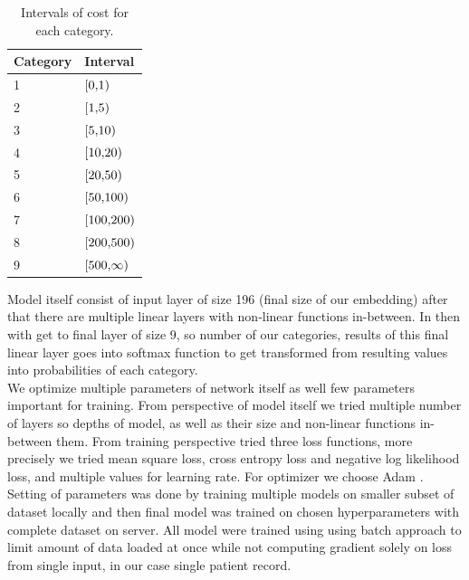 \begin{table}[!h]
	\centering
	\begin{tabular}{|l|l|}
		\hline
		Category  & Interval \\ \hline
		1 & $\interval[{0,1})$ \\ \hline
		2 & $\interval[{1,5})$ \\ \hline
		3 & $\interval[{5,10})$ \\ \hline
		4 & $\interval[{10,20})$ \\ \hline
		5 & $\interval[{20,50})$ \\ \hline
		6 & $\interval[{50,100})$ \\ \hline
		7 & $\interval[{100,200})$ \\ \hline
		8 & $\interval[{200,500})$ \\ \hline
		9 & $\interval[{500,\infty})$ \\ \hline
	\end{tabular}
	\caption{Intervals of cost for each category.}
	\label{tab:cat_interval_record}
\end{table}  

Model itself consist of input layer of size 196 (final size of our embedding) after that there are multiple linear layers with non-linear functions in-between. In then with get to final layer of size 9, so number of our categories, results of this final linear layer goes into softmax function to get transformed from resulting values into probabilities of each category. 
\\

We optimize multiple parameters of network itself as well few parameters important for training. From perspective of model itself we tried multiple number of layers so depths of model, as well as their size and non-linear functions in-between them. From training perspective tried three loss functions, more precisely we tried mean square loss, cross entropy loss and negative log likelihood loss, and multiple values for learning rate. For optimizer we choose Adam \cite{adam}.  
\\

Setting of parameters was done by training multiple models on smaller subset of dataset locally and then final model was trained on chosen hyperparameters with complete dataset on server. All model were trained using using batch approach to limit amount of data loaded at once while not computing gradient solely on loss from single input, in our case single patient record.